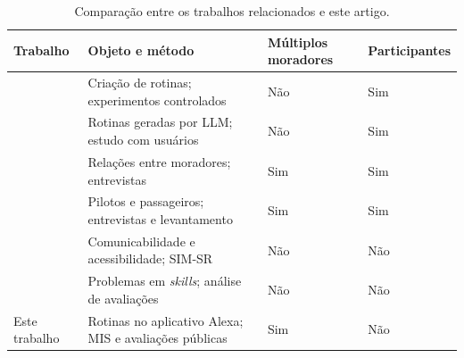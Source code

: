 \begin{table}[!htbp]
  \centering
  \caption{Comparação entre os trabalhos relacionados e este artigo.}
  \label{tab:relacionados}
  \small
  \begin{tabular}{>{\raggedright\arraybackslash}p{3.2cm}
                  >{\raggedright\arraybackslash}p{5.6cm}
                  >{\raggedright\arraybackslash}p{2.1cm}
                  >{\raggedright\arraybackslash}p{2.1cm}}
    \hline
    \textbf{Trabalho} & \textbf{Objeto e método} &
    \textbf{Múltiplos moradores} & \textbf{Participantes} \\
    \hline
    \citet{barricelli2024routines} & Criação de rotinas; experimentos controlados & Não & Sim \\
    \citet{king2024sasha} & Rotinas geradas por LLM; estudo com usuários & Não & Sim \\
    \citet{geeng2019control} & Relações entre moradores; entrevistas & Sim & Sim \\
    \citet{koshy2021passenger} & Pilotos e passageiros; entrevistas e levantamento & Sim & Sim \\
    \citet{carvalho2023simsr} & Comunicabilidade e acessibilidade; SIM-SR & Não & Não \\
    \citet{atefi2020reviews} & Problemas em \textit{skills}; análise de avaliações & Não & Não \\
    \hline
    Este trabalho & Rotinas no aplicativo Alexa; MIS e avaliações públicas & Sim & Não \\
    \hline
  \end{tabular}
\end{table}
